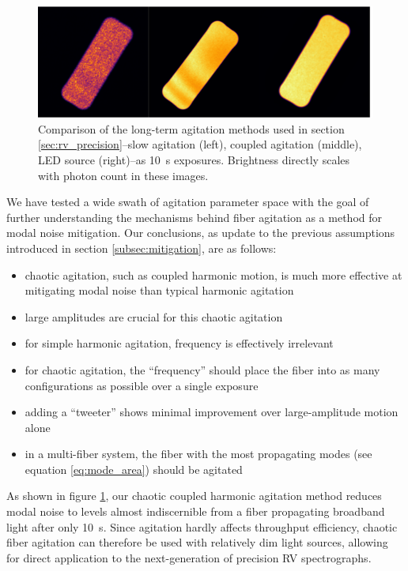 \documentclass[twocolumn]{emulateapj}
\begin{document}
\begin{figure}
\centering
	\includegraphics[width=\columnwidth]{images/fiber_rv_error.pdf}
	\caption{Comparison of the long-term agitation methods used in section \ref{sec:rv_precision}--slow agitation (left), coupled agitation (middle), LED source (right)--as \SI{10}{\second} exposures. Brightness directly scales with photon count in these images.}
\label{fig:fiber_rv_error}
\end{figure}

We have tested a wide swath of agitation parameter space with the goal of further understanding the mechanisms behind fiber agitation as a method for modal noise mitigation. Our conclusions, as update to the previous assumptions introduced in section \ref{subsec:mitigation}, are as follows:
\begin{itemize}
\item chaotic agitation, such as coupled harmonic motion, is much more effective at mitigating modal noise than typical harmonic agitation
\item large amplitudes are crucial for this chaotic agitation
\item for simple harmonic agitation, frequency is effectively irrelevant
\item for chaotic agitation, the ``frequency'' should place the fiber into as many configurations as possible over a single exposure
\item adding a ``tweeter'' shows minimal improvement over large-amplitude motion alone
\item in a multi-fiber system, the fiber with the most propagating modes (see equation \ref{eq:mode_area}) should be agitated
\end{itemize}

As shown in figure \ref{fig:fiber_rv_error}, our chaotic coupled harmonic agitation method reduces modal noise to levels almost indiscernible from a fiber propagating broadband light after only \SI{10}{\second}. Since agitation hardly affects throughput efficiency, chaotic fiber agitation can therefore be used with relatively dim light sources, allowing for direct application to the next-generation of precision RV spectrographs.
\end{document}
